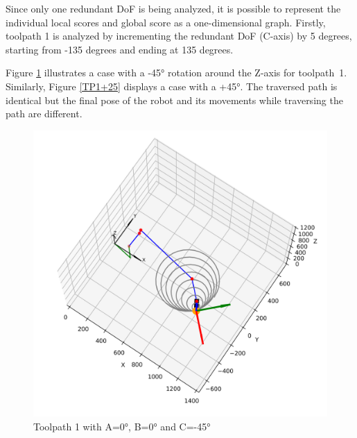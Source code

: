 Since only one redundant \acrshort{DoF} is being analyzed, it is possible to represent the individual local scores and global score as a one-dimensional graph. Firstly, toolpath 1 is analyzed by incrementing the redundant \acrshort{DoF} (C-axis) by 5 degrees, starting from -135 degrees and ending at 135 degrees.


Figure \ref{TP1-25} illustrates a case with a -45° rotation around the Z-axis for toolpath~1.
Similarly, Figure \ref{TP1+25} displays a case with a +45°. The traversed path is identical but the final pose of the robot and its movements while traversing the path are different.

\begin{figure}[H]
	\centering
	\begin{minipage}{0.5\textwidth}
		\includegraphics[width=\textwidth]{figures/robotANDpath1_-45.png}
		\caption{Toolpath 1 with A=0°, B=0° and C=-45°}
		\label{TP1-25}
	\end{minipage}\hfill
	\begin{minipage}{0.5\textwidth}

\end{minipage}
\end{figure}
